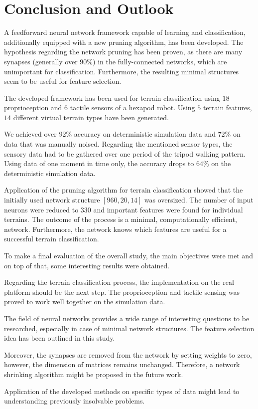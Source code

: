 \chapter{Conclusion and Outlook} \label{chap:conclusion}
A feedforward neural network framework capable of learning and classification, additionally equipped with a new pruning algorithm, has been developed. The hypothesis regarding the network pruning has been proven, as there are many synapses (generally over $ 90\% $) in the fully-connected networks, which are unimportant for classification. Furthermore, the resulting minimal structures seem to be useful for feature selection.

The developed framework has been used for terrain classification using $ 18 $ proprioception and $ 6 $ tactile sensors of a hexapod robot. Using $ 5 $ terrain features, $ 14 $ different virtual terrain types have been generated. 

We achieved over $ 92\% $ accuracy on deterministic simulation data and $ 72\% $ on data that was manually noised. Regarding the mentioned sensor types, the sensory data had to be gathered over one period of the tripod walking pattern. Using data of one moment in time only, the accuracy drops to $ 64\% $ on the deterministic simulation data.

Application of the pruning algorithm for terrain classification showed that the initially used network structure $ [960, 20, 14] $ was oversized. The number of input neurons were reduced to $ 330 $ and important features were found for individual terrains. The outcome of the process is a minimal, computationally efficient, network. Furthermore, the network knows which features are useful for a successful terrain classification. 

To make a final evaluation of the overall study, the main objectives were met and on top of that, some interesting results were obtained. 

Regarding the terrain classification process, the implementation on the real platform should be the next step. The proprioception and tactile sensing was proved to work well together on the simulation data.

The field of neural networks provides a wide range of interesting questions to be researched, especially in case of minimal network structures. The feature selection idea has been outlined in this study. 

Moreover, the synapses are removed from the network by setting weights to zero, however, the dimension of matrices remains unchanged. Therefore, a network shrinking algorithm might be proposed in the future work.

Application of the developed methods on specific types of data might lead to understanding previously insolvable problems.